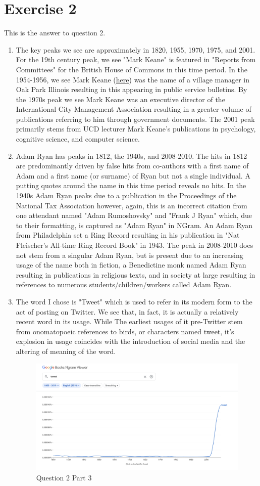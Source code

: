 \documentclass{article}
\begin{document}
\section{Exercise 2}
This is the answer to question 2.
\begin{enumerate}
	\item The key peaks we see are approximately in 1820, 1955, 1970, 1975, and 2001. For the 19th century peak, we see "Mark Keane" is featured in "Reports from Committees" for the British House of Commons in this time period. In the 1954-1956, we see Mark Keane (\href{https://www.legacy.com/us/obituaries/chicagotribune/name/mark-keane-obituary?id=2652673}{here}) was the name of a village manager in Oak Park Illinois resulting in this appearing in public service bulletins. By the 1970s peak we see Mark Keane was an executive director of the International City Management Association resulting in a greater volume of publications referring to him through government documents. The 2001 peak primarily stems from UCD lecturer Mark Keane's publications in psychology, cognitive science, and computer science.
	\item Adam Ryan has peaks in 1812, the 1940s, and 2008-2010. The hits in 1812 are predominantly driven by false hits from co-authors with a first name of Adam and a first name (or surname) of Ryan but not a single individual. A putting quotes around the name in this time period reveals no hits. In the 1940s Adam Ryan peaks due to a publication in the Proceedings of the National Tax Association however, again, this is an incorrect citation from one attendant named "Adam Rumoshovsky" and "Frank J Ryan" which, due to their formatting, is captured as "Adam Ryan" in NGram. An Adam Ryan from Philadelphia set a Ring Record resulting in his publication in "Nat Fleischer's All-time Ring Record Book" in 1943. The peak in 2008-2010 does not stem from a singular Adam Ryan, but is present due to an increasing usage of the name both in fiction, a Benedictine monk named Adam Ryan resulting in publications in religious texts, and in society at large resulting in references to numerous students/children/workers called Adam Ryan.
	\item The word I chose is "Tweet" which is used to refer in its modern form to the act of posting on Twitter. We see that, in fact, it is actually a relatively recent word in its usage. While The earliest usages of it pre-Twitter stem from onomatopoeic references to birds, or characters named tweet, it's explosion in usage coincides with the introduction of social media and the altering of meaning of the word.
	\begin{figure}[!h]
		\centering
		\includegraphics[width=0.3\linewidth]{q2e3.png}
		\caption{Question 2 Part 3}
	\end{figure}


\end{enumerate}
\end{document}
